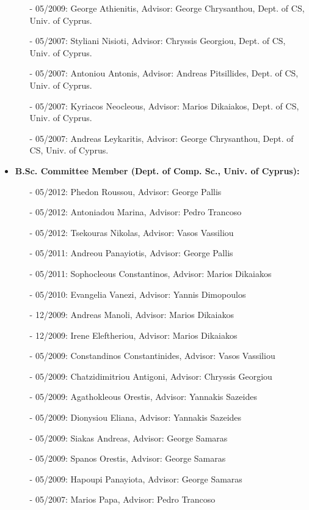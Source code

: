 \documentclass[10pt]{article}
\begin{document}
\begin{itemize}
\begin{itemize}
			\item[-] 05/2009: George Athienitis, Advisor: George Chrysanthou, Dept. of CS, Univ. of Cyprus.
			\item[-] 05/2007: Styliani Nisioti, Advisor: Chryssis Georgiou, Dept. of CS, Univ. of Cyprus.
			\item[-] 05/2007: Antoniou Antonis, Advisor: Andreas Pitsillides, Dept. of CS, Univ. of Cyprus.
			\item[-] 05/2007: Kyriacos Neocleous, Advisor: Marios Dikaiakos, Dept. of CS, Univ. of Cyprus.
			\item[-] 05/2007: Andreas Leykaritis, Advisor: George Chrysanthou,  Dept. of CS, Univ. of Cyprus.
	\end{itemize}
  
        
   \item {\bf B.Sc. Committee Member (Dept. of Comp. Sc., Univ. of Cyprus): }
	\begin{itemize}
		\setlength{\itemsep}{0.10ex}	
            \item[-]05/2012: Phedon Roussou, Advisor: George Pallis
            \item[-]05/2012: Antoniadou Marina, Advisor: Pedro Trancoso
            \item[-]05/2012: Tsekouras Nikolas, Advisor: Vasos Vassiliou                                    
            \item[-]05/2011: Andreou Panayiotis, Advisor: George Pallis
            \item[-]05/2011: Sophocleous Constantinos, Advisor: Marios Dikaiakos							
			\item[-]05/2010: Evangelia Vanezi, Advisor: Yannis Dimopoulos
			\item[-]12/2009: Andreas Manoli, Advisor: Marios Dikaiakos
			\item[-]12/2009: Irene Eleftheriou, Advisor: Marios Dikaiakos
			\item[-]05/2009: Constandinos Constantinides, Advisor: Vasos Vassiliou
			\item[-]05/2009: Chatzidimitriou Antigoni, Advisor: Chryssis Georgiou
			\item[-]05/2009: Agathokleous Orestis, Advisor: Yannakis Sazeides
			\item[-]05/2009: Dionysiou Eliana, Advisor: Yannakis Sazeides
			\item[-]05/2009: Siakas Andreas, Advisor: George Samaras
			\item[-]05/2009: Spanos Orestis, Advisor: George Samaras
			\item[-]05/2009: Hapoupi Panayiota, Advisor: George Samaras	
			\item[-]05/2007: Marios Papa, Advisor: Pedro Trancoso
	\end{itemize}
    

\end{itemize}
\end{document}

